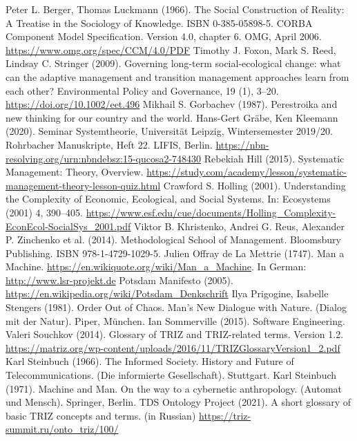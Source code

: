 \documentclass[11pt,a4paper]{article}
\begin{document}
\begin{thebibliography}{xxx}
 Peter L. Berger, Thomas Luckmann (1966). The Social
  Construction of Reality: A Treatise in the Sociology of Knowledge. ISBN
  0-385-05898-5.
 CORBA Component Model Specification.  Version 4.0, chapter 6.
  OMG, April 2006.  \url{https://www.omg.org/spec/CCM/4.0/PDF}
 Timothy J. Foxon, Mark S. Reed, Lindsay C. Stringer
  (2009). Governing long‐term social-ecological change: what can the adaptive
  management and transition management approaches learn from each other?
  Environmental Policy and Governance, 19 (1), 3--20.
  \url{https://doi.org/10.1002/eet.496}
 Mikhail S. Gorbachev (1987). Perestroika and new
  thinking for our country and the world.
 Hans-Gert Gräbe, Ken Kleemann (2020). Seminar
  Systemtheorie, Universität Leipzig, Wintersemester 2019/20. Rohrbacher
  Manuskripte, Heft 22. LIFIS, Berlin.
  \url{https://nbn-resolving.org/urn:nbndebsz:15-qucosa2-748430}
 Rebekiah Hill (2015).  Systematic Management: Theory,
  Overview.
  \url{https://study.com/academy/lesson/systematic-management-theory-lesson-quiz.html}
 Crawford S. Holling (2001). Understanding the Complexity
  of Economic, Ecological, and Social Systems. In: Ecosystems (2001) 4,
  390–405.
  \url{https://www.esf.edu/cue/documents/Holling_Complexity-EconEcol-SocialSys_2001.pdf}
 Viktor B. Khristenko, Andrei G. Reus, Alexander P. Zinchenko et
  al. (2014). Methodological School of Management. Bloomsbury Publishing. ISBN
  978-1-4729-1029-5.
 Julien Offray de La Mettrie (1747). Man a Machine.
  \url{https://en.wikiquote.org/wiki/Man_a_Machine}. In German:
  \url{http://www.lsr-projekt.de}
 Potsdam Manifesto (2005).
  \url{https://en.wikipedia.org/wiki/Potsdam_Denkschrift}
 Ilya Prigogine, Isabelle Stengers (1981). Order Out of
  Chaos. Man’s New Dialogue with Nature. (Dialog mit der Natur). Piper,
  München.
 Ian Sommerville (2015). Software Engineering.
 Valeri Souchkov (2014). Glossary of TRIZ and
  TRIZ-related terms. Version 1.2.
  \url{https://matriz.org/wp-content/uploads/2016/11/TRIZGlossaryVersion1_2.pdf} 
 Karl Steinbuch (1966). The Informed Society. History
  and Future of Telecommunications. (Die informierte Gesellschaft).
  Stuttgart.
 Karl Steinbuch (1971). Machine and Man. On the way to
  a cybernetic anthropology. (Automat und Mensch). Springer, Berlin.
 TDS Ontology Project (2021). A short glossary of basic
  TRIZ concepts and terms. (in Russian)
  \url{https://triz-summit.ru/onto_triz/100/}
\end{thebibliography}
\end{document}
